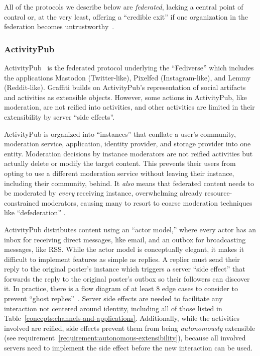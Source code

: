 All of the protocols we describe below are \emph{federated},
lacking a central point of control or,
at the very least, offering
a ``credible exit'' if one organization in the federation becomes
untrustworthy~\cite{howdecentralizedisbluesky}.

\subsubsection{ActivityPub}
\label{related-work:activitypub}

ActivityPub~\cite{activitypub} is the federated protocol underlying the
``Fediverse'' which includes the applications
Mastodon (Twitter-like), Pixelfed (Instagram-like), and
Lemmy (Reddit-like).
Graffiti builds on ActivityPub's representation of social artifacts and
activities as extensible objects.
However, some actions in ActivityPub, like moderation, are not
reified into activities, and other activities are
limited in their extensibility by server ``side effects''.

ActivityPub is organized into ``instances'' that conflate
a user's community, moderation service, application,
identity provider, and storage provider into one entity.
Moderation decisions by instance moderators are not reified activities
but actually delete or modify the target content.
This prevents their users from opting to use a different moderation
service without leaving their instance, including their community,
behind.
It \emph{also} means that federated content
needs to be moderated by \emph{every} receiving instance,
overwhelming already resource-constrained moderators, causing many
to resort to coarse moderation techniques like ``defederation''
\cite{securingfederatedplatforms}.

ActivityPub distributes content using an ``actor model,''
where every actor has an inbox for receiving direct messages, like email,
and an outbox for broadcasting messages, like RSS.
While the actor model is conceptually elegant, it makes it difficult
to implement features as simple as replies.
A replier must send their reply to the original poster's instance which
triggers a server ``side effect'' that forwards the reply to the original
poster's outbox so their followers can discover it.
In practice, there is a flow diagram of at least 8 edge cases to consider
to prevent ``ghost replies''~\cite{stateofmastodon}.
Server side effects are needed to facilitate any interaction not centered around identity,
including all of those listed in Table~\ref{concepts:channels-and-applications}.
Additionally, while the activities involved are reified, side effects prevent them
from being \emph{autonomously} extensible (see requirement~\ref{requirement:autonomous-extensibility}),
because all involved servers need to implement the side effect before
the new interaction can be used.

